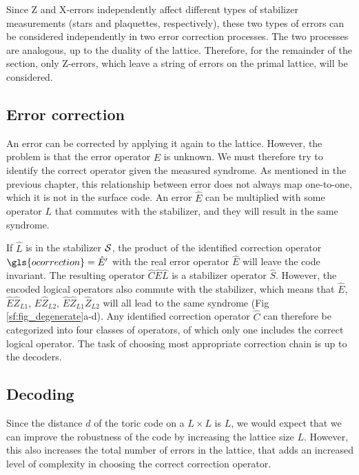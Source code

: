 Since Z and X-errors independently affect different types of stabilizer measurements (stars and plaquettes, respectively), these two types of errors can be considered independently in two error correction processes. The two processes are analogous, up to the duality of the lattice. Therefore, for the remainder of the section, only Z-errors, which leave a string of errors on the primal lattice, will be considered.


\subsection{Error correction}\label{sec:correction}
An error can be corrected by applying it again to the lattice. However, the problem is that the error operator $\hat{E}$ is unknown. We must therefore try to identify the correct operator given the measured syndrome. As mentioned in the previous chapter, this relationship between error does not always map one-to-one, which it is not in the surface code. An error $\hat{E}$ can be multiplied with some operator $L$ that commutes with the stabilizer, and they will result in the same syndrome.

If $\hat{L}$ is in the stabilizer $\mathcal{S}$, the product of the identified correction operator $\gls{ocorrection}=\hat{E}'$ with the real error operator $\hat{E}$ will leave the code invariant. The resulting operator $\hat{C}\hat{E}\hat{L}$ is a stabilizer operator $\hat{S}$. However, the encoded logical operators also commute with the stabilizer, which means that $\hat{E}$, $\hat{E}\hat{Z}_{L1}$, $\hat{E}\hat{Z}_{L2}$, $\hat{E}\hat{Z}_{L1}\hat{Z}_{L2}$ will all lead to the same syndrome (Fig \ref{sf:fig_degenerate}a-d). Any identified correction operator $\hat{C}$ can therefore be categorized into four classes of operators, of which only one includes the correct logical operator. The task of choosing most appropriate correction chain is up to the decoders.

\subsection{Decoding}\label{sec:threshold}
Since the distance $d$ of the toric code on a $L\times L$ is $L$, we would expect that we can improve the robustness of the code by increasing the lattice size $L$. However, this also increases the total number of errors in the lattice, that adds an increased level of complexity in choosing the correct correction operator.

